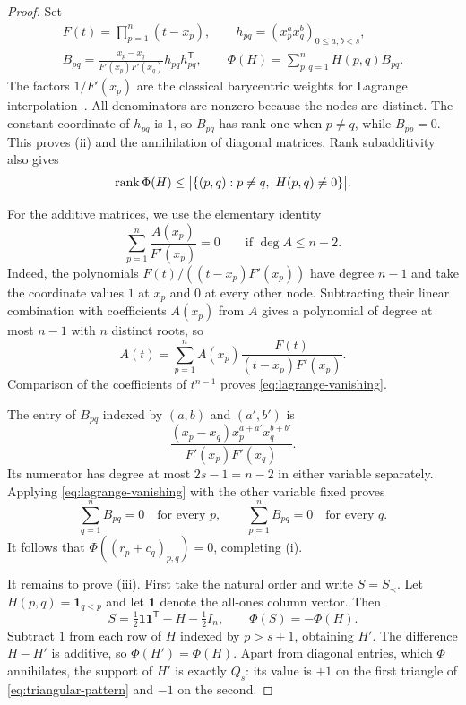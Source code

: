 \begin{proof}
Set
\begin{equation}
\label{eq:detector-definition}
\begin{gathered}
  F(t)=\prod_{p=1}^{n}(t-x_p),\qquad
  h_{pq}=(x_p^a x_q^b)_{0\leq a,b<s},\\
  B_{pq}=\frac{x_p-x_q}{F'(x_p)F'(x_q)}
              h_{pq}h_{pq}^{\mathsf T},\qquad
  \Phi(H)=\sum_{p,q=1}^{n}H(p,q)B_{pq}.
\end{gathered}
\end{equation}
The factors $1/F'(x_p)$ are the classical barycentric weights for Lagrange
interpolation~\cite[Section~3, equation~(3.2)]{BerrutTrefethen2004}.
All denominators are nonzero because the nodes are distinct.
The constant coordinate of $h_{pq}$ is $1$, so $B_{pq}$ has rank one
when $p\ne q$, while $B_{pp}=0$.  This proves \textup{(ii)} and the
annihilation of diagonal matrices.  Rank subadditivity also gives
\begin{equation}
\label{eq:detector-support-bound}
  \operatorname{rank}\Phi(H)\leq
  \bigl|\{(p,q):p\ne q,\ H(p,q)\ne0\}\bigr|.
\end{equation}

For the additive matrices, we use the elementary identity
\begin{equation}
\label{eq:lagrange-vanishing}
  \sum_{p=1}^{n}\frac{A(x_p)}{F'(x_p)}=0
  \qquad\text{if }\deg A\leq n-2.
\end{equation}
Indeed, the polynomials
$F(t)/((t-x_p)F'(x_p))$ have degree $n-1$ and take the coordinate
values $1$ at $x_p$ and $0$ at every other node.  Subtracting their
linear combination with coefficients $A(x_p)$ from $A$ gives a
polynomial of degree at most $n-1$ with $n$ distinct roots, so
\[
  A(t)=\sum_{p=1}^{n}
        A(x_p)\frac{F(t)}{(t-x_p)F'(x_p)}.
\]
Comparison of the coefficients of $t^{n-1}$ proves
\eqref{eq:lagrange-vanishing}.

The entry of $B_{pq}$ indexed by $(a,b)$ and $(a',b')$ is
\[
  \frac{(x_p-x_q)x_p^{a+a'}x_q^{b+b'}}
       {F'(x_p)F'(x_q)}.
\]
Its numerator has degree at most $2s-1=n-2$ in either variable
separately.  Applying \eqref{eq:lagrange-vanishing} with the other
variable fixed proves
\[
  \sum_{q=1}^{n}B_{pq}=0\quad\text{for every }p,
  \qquad
  \sum_{p=1}^{n}B_{pq}=0\quad\text{for every }q.
\]
It follows that $\Phi((r_p+c_q)_{p,q})=0$, completing \textup{(i)}.

It remains to prove \textup{(iii)}.  First take the natural order and
write $S=S_\prec$.  Let $H(p,q)=\mathbf{1}_{q<p}$ and let $\mathbf1$
denote the all-ones column vector.  Then
\[
  S=\tfrac12\mathbf1\mathbf1^{\mathsf T}-H-\tfrac12I_n,
  \qquad \Phi(S)=-\Phi(H).
\]
Subtract $1$ from each row of $H$ indexed by $p>s+1$, obtaining
$H'$.  The difference $H-H'$ is additive, so $\Phi(H')=\Phi(H)$.
Apart from diagonal entries, which $\Phi$ annihilates, the support
of $H'$ is exactly $Q_s$: its value is $+1$ on the first triangle
of \eqref{eq:triangular-pattern} and $-1$ on the second.


\end{proof}
